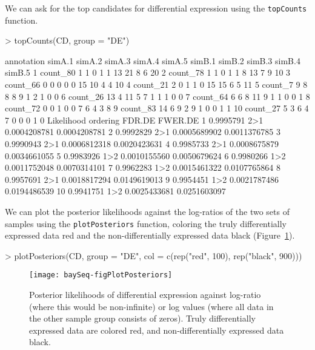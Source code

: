 \documentclass[a4paper]{article}
\begin{document}
We can ask for the top candidates for differential expression using the \verb'topCounts' function.
\begin{Schunk}
\begin{Sinput}
> topCounts(CD, group = "DE")  
\end{Sinput}
\begin{Soutput}
   annotation simA.1 simA.2 simA.3 simA.4 simA.5 simB.1 simB.2 simB.3 simB.4 simB.5
1    count_80      1      1      0      1      1     13     21      8      6     20
2    count_78      1      1      0      1      1      8     13      7      9     10
3    count_66      0      0      0      0      0     15     10      4      4     10
4    count_21      2      0      1      1      0     15     15      6      5     11
5     count_7      9      8      8      8      9      1      2      1      0      0
6    count_26     13      4     11      5      7      1      1      1      0      0
7    count_64      6      6      8     11      9      1      1      0      0      1
8    count_72      0      0      1      0      0      7      6      4      3      8
9    count_83     14      6      9      2      9      1      0      0      1      1
10   count_27      5      3      6      4      7      0      0      0      1      0
   Likelihood ordering       FDR.DE      FWER.DE
1   0.9995791      2>1 0.0004208781 0.0004208781
2   0.9992829      2>1 0.0005689902 0.0011376785
3   0.9990943      2>1 0.0006812318 0.0020423631
4   0.9985733      2>1 0.0008675879 0.0034661055
5   0.9983926      1>2 0.0010155560 0.0050679624
6   0.9980266      1>2 0.0011752048 0.0070314101
7   0.9962283      1>2 0.0015461322 0.0107765864
8   0.9957691      2>1 0.0018817294 0.0149619013
9   0.9954451      1>2 0.0021787486 0.0194486539
10  0.9941751      1>2 0.0025433681 0.0251603097
\end{Soutput}
\end{Schunk}

We can plot the posterior likelihoods against the log-ratios of the two sets of samples using the \verb'plotPosteriors' function, coloring the truly differentially expressed data red and the non-differentially expressed data black (Figure~\ref{figPPs}).
\begin{Schunk}
\begin{Sinput}
> plotPosteriors(CD, group = "DE", col = c(rep("red", 100), rep("black", 900)))
\end{Sinput}
\end{Schunk}

\begin{figure}[!ht]
\begin{center}

\texttt{[image: baySeq-figPlotPosteriors]}
\caption{Posterior likelihoods of differential expression against log-ratio (where this would be non-infinite) or log values (where all data in the other sample group consists of zeros). Truly differentially expressed data are colored red, and non-differentially expressed data black.}
\label{figPPs}
\end{center}
\end{figure}
\end{document}
